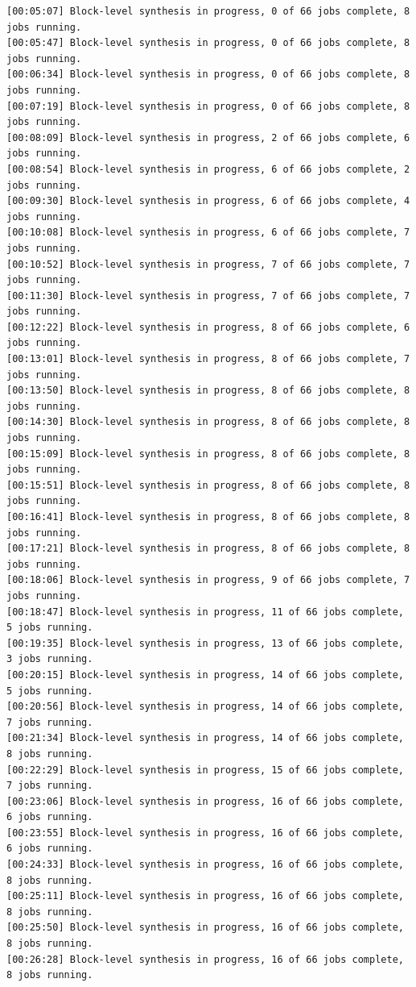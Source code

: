 \begin{lstlisting}
[00:05:07] Block-level synthesis in progress, 0 of 66 jobs complete, 8 jobs running.
[00:05:47] Block-level synthesis in progress, 0 of 66 jobs complete, 8 jobs running.
[00:06:34] Block-level synthesis in progress, 0 of 66 jobs complete, 8 jobs running.
[00:07:19] Block-level synthesis in progress, 0 of 66 jobs complete, 8 jobs running.
[00:08:09] Block-level synthesis in progress, 2 of 66 jobs complete, 6 jobs running.
[00:08:54] Block-level synthesis in progress, 6 of 66 jobs complete, 2 jobs running.
[00:09:30] Block-level synthesis in progress, 6 of 66 jobs complete, 4 jobs running.
[00:10:08] Block-level synthesis in progress, 6 of 66 jobs complete, 7 jobs running.
[00:10:52] Block-level synthesis in progress, 7 of 66 jobs complete, 7 jobs running.
[00:11:30] Block-level synthesis in progress, 7 of 66 jobs complete, 7 jobs running.
[00:12:22] Block-level synthesis in progress, 8 of 66 jobs complete, 6 jobs running.
[00:13:01] Block-level synthesis in progress, 8 of 66 jobs complete, 7 jobs running.
[00:13:50] Block-level synthesis in progress, 8 of 66 jobs complete, 8 jobs running.
[00:14:30] Block-level synthesis in progress, 8 of 66 jobs complete, 8 jobs running.
[00:15:09] Block-level synthesis in progress, 8 of 66 jobs complete, 8 jobs running.
[00:15:51] Block-level synthesis in progress, 8 of 66 jobs complete, 8 jobs running.
[00:16:41] Block-level synthesis in progress, 8 of 66 jobs complete, 8 jobs running.
[00:17:21] Block-level synthesis in progress, 8 of 66 jobs complete, 8 jobs running.
[00:18:06] Block-level synthesis in progress, 9 of 66 jobs complete, 7 jobs running.
[00:18:47] Block-level synthesis in progress, 11 of 66 jobs complete, 5 jobs running.
[00:19:35] Block-level synthesis in progress, 13 of 66 jobs complete, 3 jobs running.
[00:20:15] Block-level synthesis in progress, 14 of 66 jobs complete, 5 jobs running.
[00:20:56] Block-level synthesis in progress, 14 of 66 jobs complete, 7 jobs running.
[00:21:34] Block-level synthesis in progress, 14 of 66 jobs complete, 8 jobs running.
[00:22:29] Block-level synthesis in progress, 15 of 66 jobs complete, 7 jobs running.
[00:23:06] Block-level synthesis in progress, 16 of 66 jobs complete, 6 jobs running.
[00:23:55] Block-level synthesis in progress, 16 of 66 jobs complete, 6 jobs running.
[00:24:33] Block-level synthesis in progress, 16 of 66 jobs complete, 8 jobs running.
[00:25:11] Block-level synthesis in progress, 16 of 66 jobs complete, 8 jobs running.
[00:25:50] Block-level synthesis in progress, 16 of 66 jobs complete, 8 jobs running.
[00:26:28] Block-level synthesis in progress, 16 of 66 jobs complete, 8 jobs running.

\end{lstlisting}
